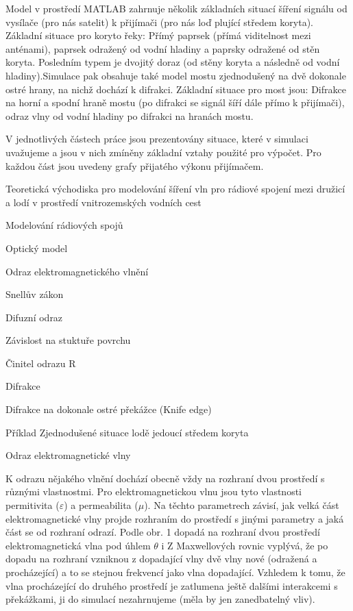 	Model v prostředí MATLAB zahrnuje několik základních situací šíření
signálu od vysílače (pro nás satelit) k přijímači (pro nás loď plující středem
koryta). Základní situace pro koryto řeky: Přímý paprsek (přímá viditelnost mezi
anténami), paprsek odražený od vodní hladiny a paprsky odražené od stěn
koryta. Posledním typem je dvojitý doraz (od stěny koryta a následně od vodní
hladiny).Simulace pak obsahuje také model mostu zjednodušený na dvě
dokonale ostré hrany, na nichž dochází k difrakci. Základní situace pro most
jsou: Difrakce na horní a spodní hraně mostu (po difrakci se signál šíří dále
přímo k přijímači), odraz vlny od vodní hladiny po difrakci na hranách mostu.

	V jednotlivých částech práce jsou prezentovány situace, které v simulaci
uvažujeme a jsou v nich zmíněny základní vztahy použité pro výpočet.
Pro každou část jsou uvedeny grafy přijatého výkonu přijímačem.
 
\chap Teoretická východiska pro modelování šíření vln pro rádiové spojení mezi družicí a lodí v prostředí vnitrozemských vodních cest
 
 
 
\sec Modelování rádiových spojů
 
\sec Optický model

\sec Odraz elektromagnetického vlnění

\secc Snellův zákon

\secc Difuzní odraz

\secc Závislost na stuktuře povrchu

\secc Činitel odrazu R 

\sec Difrakce

\secc Difrakce na dokonale ostré překážce (Knife edge)

\secc Příklad Zjednodušené situace lodě jedoucí středem koryta
 
 \chap Odraz elektromagnetické vlny

K odrazu nějakého vlnění dochází obecně vždy na rozhraní dvou
prostředí s různými vlastnostmi. Pro elektromagnetickou vlnu jsou tyto
vlastnosti permitivita ($\varepsilon$) a permeabilita ($\mu$). Na těchto parametrech závisí, jak
velká část elektromagnetické vlny projde rozhraním do prostředí s jinými
parametry a jaká část se od rozhraní odrazí. Podle obr. 1 dopadá na rozhraní
dvou prostředí elektromagnetická vlna pod úhlem $\theta$ i Z Maxwellových rovnic
vyplývá, že po dopadu na rozhraní vzniknou z dopadající vlny dvě vlny nové
(odražená a procházející) a to se stejnou frekvencí jako vlna dopadající.
Vzhledem k tomu, že vlna procházející do druhého prostředí je zatlumena
ještě dalšími interakcemi s překážkami, ji do simulací nezahrnujeme (měla by
jen zanedbatelný vliv).
 
